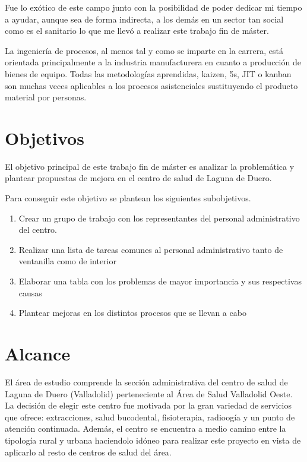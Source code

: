 Fue lo exótico de este campo junto con la posibilidad de poder dedicar mi tiempo a ayudar, aunque sea de forma indirecta, a los demás en un sector tan social como es el sanitario lo que me llevó a realizar este trabajo fin de máster.

La ingeniería de procesos, al menos tal y como se imparte en la carrera, está orientada principalmente a la industria manufacturera en cuanto a producción de bienes de equipo. Todas las metodologías aprendidas, kaizen, 5s, JIT o kanban son muchas veces aplicables a los procesos asistenciales sustituyendo el producto material por personas.

\section{Objetivos}

El objetivo principal de este trabajo fin de máster es analizar la problemática y plantear propuestas de mejora en el centro de salud de Laguna de Duero.

Para conseguir este objetivo se plantean los siguientes subobjetivos.
\begin{enumerate}
    \item Crear un grupo de trabajo con los representantes del personal administrativo del centro.
    \item Realizar una lista de tareas comunes al personal administrativo tanto de ventanilla como de interior
    \item Elaborar una tabla con los problemas de mayor importancia y sus respectivas causas
    \item Plantear mejoras en los distintos procesos que se llevan a cabo
\end{enumerate}

\section{Alcance}

El área de estudio comprende la sección administrativa del centro de salud de Laguna de Duero (Valladolid) perteneciente al Área de Salud Valladolid Oeste. La decisión de elegir este centro fue motivada por la gran variedad de servicios que ofrece: extracciones, salud bucodental, fisioterapia, radioogía y un punto de atención continuada. Además, el centro se encuentra a medio camino entre la tipología rural y urbana haciendolo idóneo para realizar este proyecto en vista de aplicarlo al resto de centros de salud del área.

